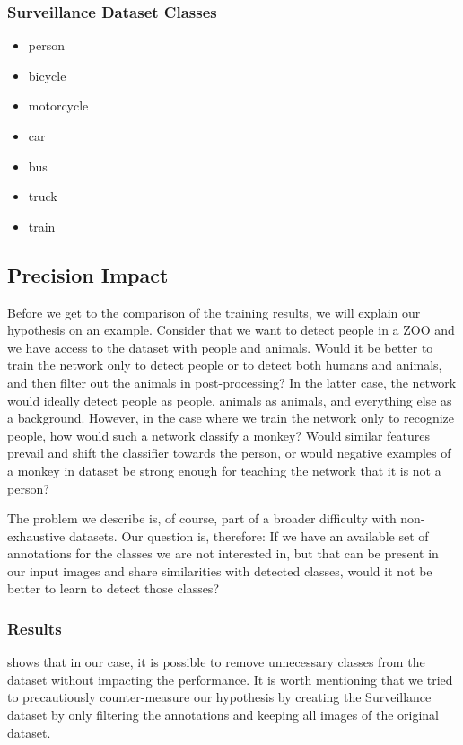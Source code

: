 \subsubsection{Surveillance Dataset Classes}
\begin{multicols}{2}
    \begin{itemize}
        \item person
        \item bicycle
        \item motorcycle
        \item car
        \item bus
        \item truck
        \item train
    \end{itemize}
\end{multicols}

\subsection{Precision Impact}
Before we get to the comparison of the training results, we will explain our hypothesis on an example. Consider that we want to detect people in a ZOO and we have access to the dataset with people and animals. Would it be better to train the network only to detect people or to detect both humans and animals, and then filter out the animals in post-processing? In the latter case, the network would ideally detect people as people, animals as animals, and everything else as a background. However, in the case where we train the network only to recognize people, how would such a network classify a monkey? Would similar features prevail and shift the classifier towards the person, or would negative examples of a monkey in dataset be strong enough for teaching the network that it is not a person? 

The problem we describe is, of course, part of a broader difficulty with non-exhaustive datasets. Our question is, therefore: If we have an available set of annotations for the classes we are not interested in, but that can be present in our input images and share similarities with detected classes, would it not be better to learn to detect those classes?

\subsubsection{Results}
 shows that in our case, it is possible to remove unnecessary classes from the dataset without impacting the performance. It is worth mentioning that we tried to precautiously counter-measure our hypothesis by creating the Surveillance dataset by only filtering the annotations and keeping all images of the original dataset.

